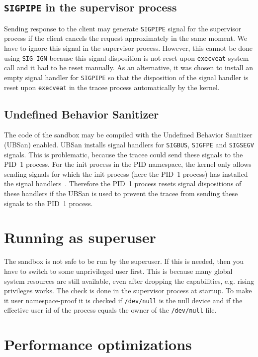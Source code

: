 \documentclass[en]{pracamgr}
\begin{document}
\subsection{\texttt{SIGPIPE} in the supervisor process}

Sending response to the client may generate \texttt{SIGPIPE} signal for the supervisor process if the client cancels the request approximately in the same moment. We have to ignore this signal in the supervisor process. However, this cannot be done using \texttt{SIG\_IGN} because this signal disposition is not reset upon \texttt{execveat} system call and it had to be reset manually. As an alternative, it was chosen to install an empty signal handler for \texttt{SIGPIPE} so that the disposition of the signal handler is reset upon \texttt{execveat} in the tracee process automatically by the kernel.

\subsection{Undefined Behavior Sanitizer}

The code of the sandbox may be compiled with the Undefined Behavior Sanitizer (UBSan) enabled. UBSan installs signal handlers for \texttt{SIGBUS}, \texttt{SIGFPE} and \texttt{SIGSEGV} signals. This is problematic, because the tracee could send these signals to the PID~1 process. For the init process in the PID namespace, the kernel only allows sending signals for which the init process (here the PID~1 process) has installed the signal handlers~\cite{man_pid_namespaces}. Therefore the PID~1 process resets signal dispositions of these handlers if the UBSan is used to prevent the tracee from sending these signals to the PID~1 process.

\section{Running as superuser}

The sandbox is not safe to be run by the superuser. If this is needed, then you have to switch to some unprivileged user first. This is because many global system resources are still available, even after dropping the capabilities, e.g. rising privileges works. The check is done in the supervisor process at startup. To make it user namespace-proof it is checked if \texttt{/dev/null} is the null device and if the effective user id of the process equals the owner of the \texttt{/dev/null} file.

\section{Performance optimizations}
\end{document}
